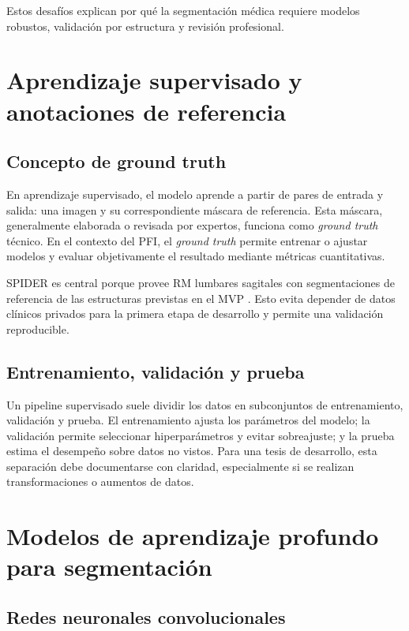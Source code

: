 Estos desafíos explican por qué la segmentación médica requiere modelos robustos, validación por estructura y revisión profesional.

\section{Aprendizaje supervisado y anotaciones de referencia}

\subsection{Concepto de ground truth}

En aprendizaje supervisado, el modelo aprende a partir de pares de entrada y salida: una imagen y su correspondiente máscara de referencia. Esta máscara, generalmente elaborada o revisada por expertos, funciona como \textit{ground truth} técnico. En el contexto del PFI, el \textit{ground truth} permite entrenar o ajustar modelos y evaluar objetivamente el resultado mediante métricas cuantitativas.

SPIDER es central porque provee RM lumbares sagitales con segmentaciones de referencia de las estructuras previstas en el MVP \parencite{vandergraaf_spider_2024}. Esto evita depender de datos clínicos privados para la primera etapa de desarrollo y permite una validación reproducible.

\subsection{Entrenamiento, validación y prueba}

Un pipeline supervisado suele dividir los datos en subconjuntos de entrenamiento, validación y prueba. El entrenamiento ajusta los parámetros del modelo; la validación permite seleccionar hiperparámetros y evitar sobreajuste; y la prueba estima el desempeño sobre datos no vistos. Para una tesis de desarrollo, esta separación debe documentarse con claridad, especialmente si se realizan transformaciones o aumentos de datos.

\section{Modelos de aprendizaje profundo para segmentación}

\subsection{Redes neuronales convolucionales}

